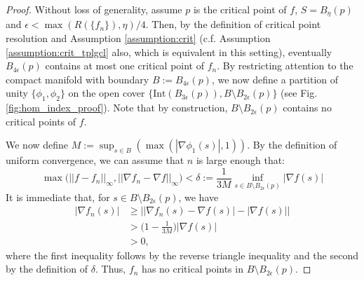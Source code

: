 \documentclass[11pt]{article}
\newcommand{\1}{\mathbf{1}}
\theoremstyle{definition}
\theoremstyle{remark}
\begin{document}
    \begin{proof}
    Without loss of generality, assume $p$ is the critical point of $f$, $S=B_\eta(p)$ and $\epsilon<\max(R(\{ f_n\}),\eta)/4$. Then, by the definition of critical point resolution and Assumption \ref{assumption:crit} (c.f. Assumption \ref{assumption:crit_tplgcl} also, which is equivalent in this setting), eventually $B_{4\epsilon}(p)$ contains at most one critical point of $f_n$. By restricting attention to the compact manifold with boundary $B:=B_{4\epsilon}(p)$, we now define a partition of unity $\{\phi_1,\phi_2\}$ on the open cover $\{\text{Int}(B_{3\epsilon}(p)), B\setminus B_{2\epsilon}(p)\}$ (see Fig. \ref{fig:hom_index_proof}). Note that by construction, $B\setminus B_{2\epsilon}(p)$ contains no critical points of $f$. 
    
    We now define $M:=\sup_{s\in B}(\max(|\nabla\phi_1(s)|,1))$. By the definition of uniform convergence, we can assume that $n$ is large enough that:
    \begin{equation}\nonumber
        \max\bigg(||f-f_n||_\infty,||\nabla f_n-\nabla f||_\infty\bigg) <\delta:= \frac{1}{3M} \inf_{s \in B\setminus B_{2\epsilon}(p)}|\nabla f(s)|
    \end{equation}
    It is immediate that, for $s \in B\setminus B_{2\epsilon}(p)$, we have
    \begin{equation}\nonumber
    \begin{aligned}
        |\nabla f_n(s)| & \geq \big||\nabla f_n(s)-\nabla f(s)|-|\nabla f(s)|\big| \\
        & > \bigg(1-\frac{1}{3M}\bigg)|\nabla f(s)| \\
        & > 0,
    \end{aligned}
    \end{equation}
    where the first inequality follows by the reverse triangle inequality and the second by the definition of $\delta$. Thus, $f_n$ has no critical points in $B\setminus B_{2\epsilon}(p)$.


\end{proof}
\end{document}
